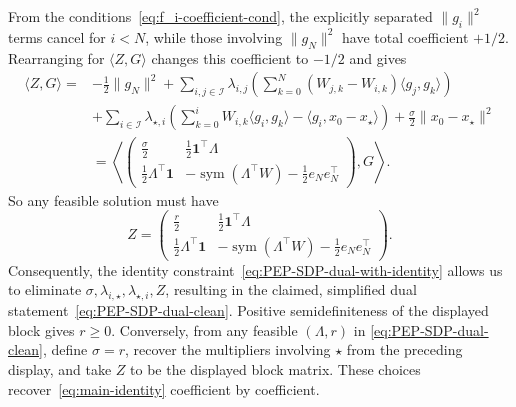 \documentclass[11pt]{article}
\begin{document}
From the conditions~\eqref{eq:f_i-coefficient-cond}, the explicitly separated $\|g_i\|^2$ terms cancel for $i<N$, while those involving $\|g_N\|^2$ have total coefficient $+1/2$. Rearranging for $\langle Z,G\rangle$ changes this coefficient to $-1/2$ and gives
\begin{align*}
    \langle Z,G\rangle = &-\frac{1}{2}\|g_N\|^2 + \sum_{i,j\in\mathcal{I}} \lambda_{i,j}\left(\sum_{k=0}^N (W_{j,k} - W_{i,k})\langle g_j, g_k\rangle\right) \\
    &+\sum_{i\in\mathcal{I}} \lambda_{\star,i}\left(\sum_{k=0}^{i} W_{i,k}\langle g_i,g_k\rangle - \langle g_i, x_0-x_\star\rangle\right) + \frac{\sigma}{2}\|x_0-x_\star\|^2\\
    &= \left\langle \begin{pmatrix}
            \frac{\sigma}{2} & \frac{1}{2}\mathbf{1}^\top\Lambda\\
            \frac{1}{2}\Lambda^\top \mathbf{1} & -\operatorname{sym}\left(\Lambda^\top W\right)-\frac{1}{2}e_Ne_N^\top
    \end{pmatrix}, G\right\rangle.
\end{align*}
So any feasible solution must have
\[
Z=
\begin{pmatrix}
    \frac r2 & \frac12\mathbf1^\top\Lambda\\[1mm]
    \frac12\Lambda^\top\mathbf1
    &-\operatorname{sym}(\Lambda^\top W)-\frac12e_Ne_N^\top
\end{pmatrix}.
\]
Consequently, the identity constraint~\eqref{eq:PEP-SDP-dual-with-identity} allows us to eliminate $\sigma,\lambda_{i,\star},\lambda_{\star,i},Z$, resulting in the claimed, simplified dual statement~\eqref{eq:PEP-SDP-dual-clean}. Positive semidefiniteness of the displayed
block gives $r\geq0$. Conversely, from any feasible $(\Lambda,r)$ in
\eqref{eq:PEP-SDP-dual-clean}, define $\sigma=r$, recover the
multipliers involving $\star$ from the preceding display, and take $Z$ to be
the displayed block matrix. These choices recover~\eqref{eq:main-identity}
coefficient by coefficient.
\end{document}
